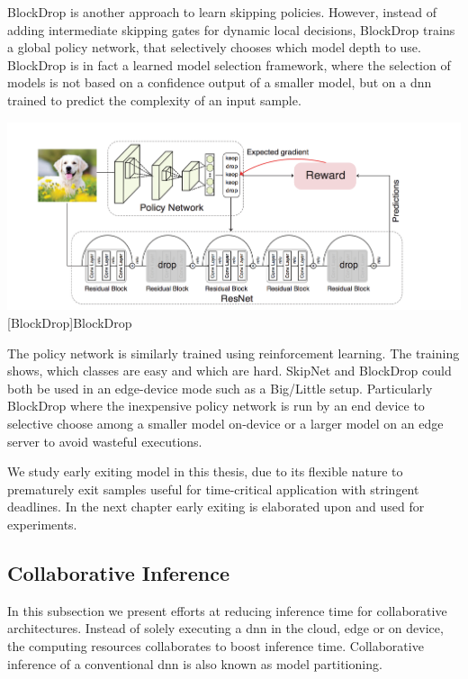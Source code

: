 \begin{enumdescript}
	BlockDrop \cite{wu_blockdrop:_2017} is another approach to learn skipping policies. However, instead of adding intermediate skipping gates for dynamic local decisions, BlockDrop trains a global policy network, that selectively chooses which model depth to use. BlockDrop is in fact a learned model selection framework, where the selection of models is not based on a confidence output of a smaller model, but on a \gls{dnn} trained to predict the complexity of an input sample. 
	
	
	\begin{minipage}[t]{\linewidth}    
		\centering
		\includegraphics[width=\linewidth]{figures/models/blockdrop}
		[BlockDrop]{BlockDrop}
	\end{minipage}
	
	The policy network is similarly trained using reinforcement learning. The training shows, which classes are easy and which are hard. SkipNet and BlockDrop could both be used in an edge-device mode such as a Big/Little \cite{park_big/little_2015} setup. Particularly BlockDrop where the inexpensive policy network is run by an end device to selective choose among a smaller model on-device or a larger model on an edge server to avoid wasteful executions.
	
	We study early exiting model in this thesis, due to its flexible nature to prematurely exit samples useful for time-critical application with stringent deadlines. In the next chapter early exiting is elaborated upon and used for experiments.
	


\end{enumdescript}

\subsection{Collaborative Inference}

In this subsection we present efforts at reducing inference time for collaborative architectures. Instead of solely executing a \gls{dnn} in the cloud, edge or on device, the computing resources collaborates to boost inference time. Collaborative inference of a conventional \gls{dnn} is also known as model partitioning.

